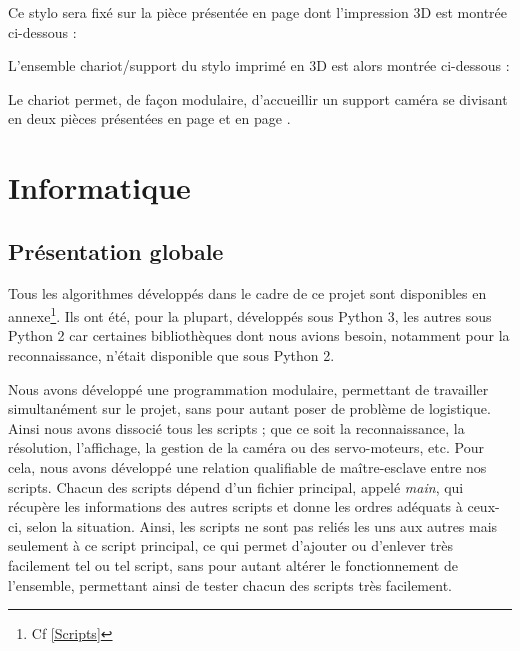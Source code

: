 \documentclass[12pt,a4paper]{report}
\begin{document}
	Ce stylo sera fixé sur la pièce présentée en page \pageref{supportstylo} dont l'impression 3D est montrée ci-dessous :
	
	
L'ensemble chariot/support du stylo imprimé en 3D est alors montrée ci-dessous :


Le chariot permet, de façon modulaire, d'accueillir un support caméra se divisant en deux pièces présentées en page \pageref{chariotcamera} et en page \pageref{supportcamera}.
	
	\chapter{Informatique}
\section{Présentation globale}
	Tous les algorithmes développés dans le cadre de ce projet sont disponibles en annexe\footnote{Cf \ref{Scripts}}. Ils ont été, pour la plupart, développés sous Python 3, les autres sous Python 2 car certaines bibliothèques dont nous avions besoin, notamment pour la reconnaissance, n'était disponible que sous Python 2. 
	
	Nous avons développé une programmation modulaire, permettant de travailler simultanément sur le projet, sans pour autant poser de problème de logistique. Ainsi nous avons dissocié tous les scripts ; que ce soit la reconnaissance, la résolution, l'affichage, la gestion de la caméra ou des servo-moteurs, etc. Pour cela, nous avons développé une relation qualifiable de maître-esclave entre nos scripts. Chacun des scripts dépend d'un fichier principal, appelé \emph{main}, qui récupère les informations des autres scripts et donne les ordres adéquats à ceux-ci, selon la situation. Ainsi, les scripts ne sont pas reliés les uns aux autres mais seulement à ce script principal, ce qui permet d'ajouter ou d'enlever très facilement tel ou tel script, sans pour autant altérer le fonctionnement de l'ensemble, permettant ainsi de tester chacun des scripts très facilement.
	
\end{document}
